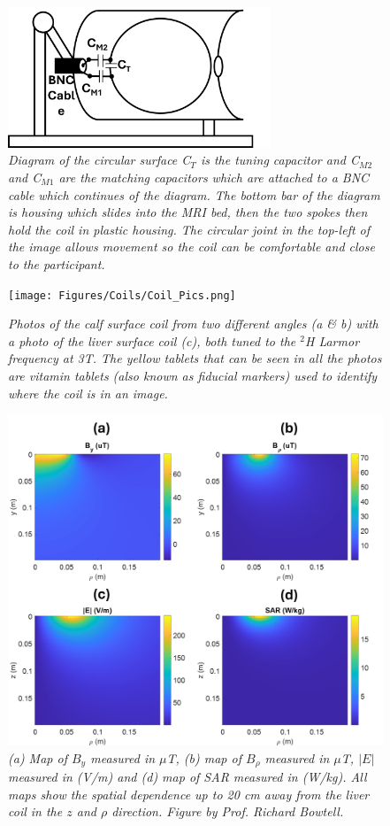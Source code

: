 \begin{figure}[H]
    \centering
    \includegraphics[width=0.7\textwidth]{Figures/Coils/Liver_Coil.png}
    \caption{\textit{Diagram of the circular surface C$_T$ is the tuning capacitor and C$_{M2}$ and C$_{M1}$ are the matching capacitors which are attached to a BNC cable which continues of the diagram. The bottom bar of the diagram is housing which slides into the \ac{MRI} bed, then the two spokes then hold the coil in plastic housing. The circular joint in the top-left of the image allows movement so the coil can be comfortable and close to the participant.}}
    \label{fig:coils:Liver}
\end{figure}

\begin{figure}[H]
    \centering
    \texttt{[image: Figures/Coils/Coil\_Pics.png]}
    \caption{\textit{Photos of the calf surface coil from two different angles (a \& b) with a photo of the liver surface coil (c), both tuned to the $^2$H Larmor frequency at 3T. The yellow tablets that can be seen in all the photos are vitamin tablets (also known as fiducial markers) used to identify where the coil is in an image.}}
    \label{fig:coils:Pics}
\end{figure}

\begin{figure}[H]
    \centering
    \includegraphics[width=0.8\linewidth]{Figures/Coils/Liver_Maps.png}
    \caption{\textit{(a) Map of $B_y$ measured in $\mu$T, (b) map of $B_\rho$ measured in $\mu$T, $|E|$ measured in (V/m) and (d) map of \ac{SAR} measured in (W/kg). All maps show the spatial dependence up to 20 cm away from the liver coil in the $z$ and $\rho$ direction. Figure by Prof. Richard Bowtell.}}
    \label{fig:coils:Liver_Maps}
\end{figure}

